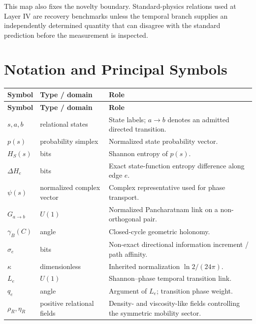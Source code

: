 This map also fixes the novelty boundary. Standard-physics relations used at Layer IV are recovery benchmarks unless the temporal branch supplies an independently determined quantity that can disagree with the standard prediction before the measurement is inspected.


\chapter*{Notation and Principal Symbols}

\small
\setlength{\LTpre}{0pt}
\setlength{\LTpost}{0pt}
\begin{longtable}{p{}p{}p{}}
\toprule
\textbf{Symbol} & \textbf{Type / domain} & \textbf{Role} \\
\midrule
\endfirsthead
\toprule
\textbf{Symbol} & \textbf{Type / domain} & \textbf{Role} \\
\midrule
\endhead
\(s,a,b\) & relational states & State labels; \(a\to b\) denotes an admitted directed transition. \\
\(p(s)\) & probability simplex & Normalized state probability vector. \\
\(H_S(s)\) & bits & Shannon entropy of \(p(s)\). \\
\(\Delta H_e\) & bits & Exact state-function entropy difference along edge \(e\). \\
\(\psi(s)\) & normalized complex vector & Complex representative used for phase transport. \\
\(G_{a\to b}\) & \(U(1)\) & Normalized Pancharatnam link on a non-orthogonal pair. \\
\(\gamma_B(C)\) & angle & Closed-cycle geometric holonomy. \\
\(\sigma_e\) & bits & Non-exact directional information increment / path affinity. \\
\(\kappa\) & dimensionless & Inherited normalization \(\ln2/(24\pi)\). \\
\(L_e\) & \(U(1)\) & Shannon--phase temporal transition link. \\
\(q_e\) & angle & Argument of \(L_e\); transition phase weight. \\
\(\rho_R,\eta_R\) & positive relational fields & Density- and viscosity-like fields controlling the symmetric mobility sector. \\

\end{longtable}

